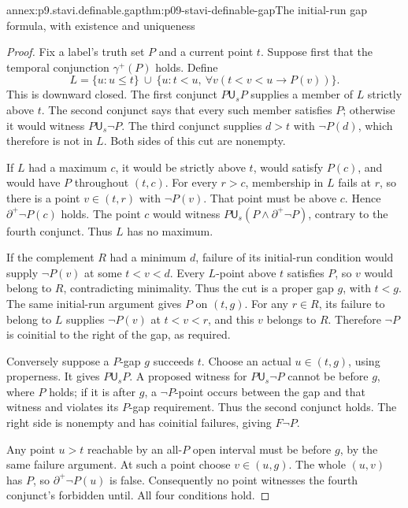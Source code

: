 \begin{annexitem}{annex:p9.stavi.definable.gap}{thm:p09-stavi-definable-gap}{The initial-run gap formula, with existence and uniqueness}
\begin{proof}
Fix a label's truth set \(P\) and a current point \(t\).
Suppose first that the temporal conjunction \(\gamma^+(P)\)
holds. Define
\[
       L=\{u:u\leq t\}\ \cup\
             \{u:t<u,\ \forall v(t<v<u\to P(v))\}.
\]
This is downward closed. The first conjunct \(P\mathbin{\mathsf U_s}P\)
supplies a member of \(L\) strictly above \(t\).
The second conjunct says that every such member
satisfies \(P\); otherwise it would witness
\(P\mathbin{\mathsf U_s}\neg P\).
The third conjunct supplies \(d>t\) with
\(\neg P(d)\), which therefore is not in \(L\).
Both sides of this cut are nonempty.

If \(L\) had a maximum \(c\), it would be
strictly above \(t\), would satisfy \(P(c)\),
and would have \(P\) throughout \((t,c)\).
For every \(r>c\), membership in \(L\) fails
at \(r\), so there is a point \(v\in(t,r)\)
with \(\neg P(v)\). That point must be
above \(c\). Hence \(\partial^+\neg P(c)\)
holds. The point \(c\) would witness
\(P\mathbin{\mathsf U_s}(P\land\partial^+\neg P)\),
contrary to the fourth conjunct. Thus
\(L\) has no maximum.

If the complement \(R\) had a minimum \(d\),
failure of its initial-run condition would
supply \(\neg P(v)\) at some \(t<v<d\).
Every \(L\)-point above \(t\) satisfies \(P\),
so \(v\) would belong to \(R\), contradicting
minimality. Thus the cut is a proper gap
\(g\), with \(t<g\).
The same initial-run argument gives \(P\)
on \((t,g)\). For any \(r\in R\), its
failure to belong to \(L\) supplies
\(\neg P(v)\) at \(t<v<r\), and this
\(v\) belongs to \(R\). Therefore
\(\neg P\) is coinitial to the right
of the gap, as required.

Conversely suppose a \(P\)-gap \(g\)
succeeds \(t\). Choose an actual
\(u\in(t,g)\), using properness.
It gives \(P\mathbin{\mathsf U_s}P\).
A proposed witness for
\(P\mathbin{\mathsf U_s}\neg P\)
cannot be before \(g\), where \(P\)
holds; if it is after \(g\), a
\(\neg P\)-point occurs between
the gap and that witness and
violates its \(P\)-gap requirement.
Thus the second conjunct holds.
The right side is nonempty and
has coinitial failures, giving
\(F\neg P\).

Any point \(u>t\) reachable by
an all-\(P\) open interval must
be before \(g\), by the same
failure argument. At such a
point choose \(v\in(u,g)\).
The whole \((u,v)\) has \(P\),
so \(\partial^+\neg P(u)\)
is false. Consequently no
point witnesses the fourth
conjunct's forbidden until.
All four conditions hold.


\end{proof}
\end{annexitem}
